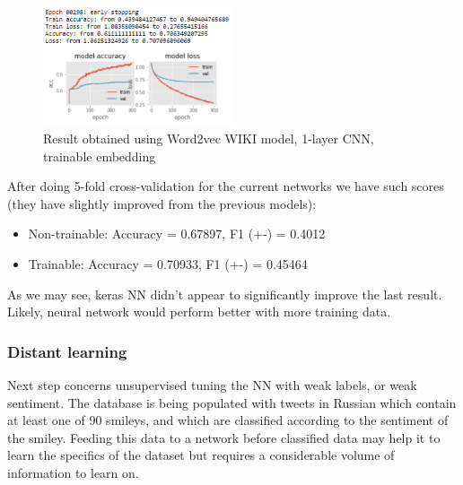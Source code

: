 \documentclass[12pt,a4paper]{article}
\begin{document}
\begin{figure}
\centering
\includegraphics[width=0.5\textwidth]{figures/results_cnn_tr.PNG}
\caption{Result obtained using Word2vec WIKI model, 1-layer CNN, trainable embedding}
\label{fig:results_cnn_tr}
\end{figure}

After doing 5-fold cross-validation for the current networks we have such scores (they have slightly improved from the previous models):
\begin{itemize}
\item Non-trainable: Accuracy = 0.67897, F1 (+-) =  0.4012
\item Trainable: Accuracy = 0.70933, F1 (+-) =  0.45464
\end{itemize}



As we may see, keras NN didn't appear to significantly improve the last result. Likely, neural network would perform better with more training data.

\subsubsection{Distant learning}
Next step concerns unsupervised tuning the NN with weak labels, or weak sentiment. The database is being populated with tweets in Russian which contain at least one of 90 smileys, and which are classified according to the sentiment of the smiley. Feeding this data to a network before classified data may help it to learn the specifics of the dataset but requires a considerable volume of information to learn on.
\end{document}
